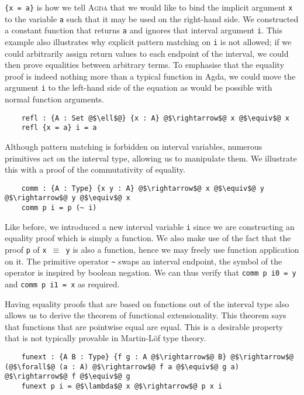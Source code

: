 \documentclass[12pt,twoside,maitrise]{dms}
\theoremstyle{definition}
\numberwithin{equation}{section}
\numberwithin{table}{chapter}
\numberwithin{figure}{chapter}
\newcommand\id[1] {\texttt{#1}}
\newcommand\fn[1] {\texttt{#1}}
\def\Agda{\textsc{Agda}\xspace}
\begin{document}
\fn{\{x = a\}} is how we tell \Agda{} that we would like to bind the implicit
argument \id{x} to the variable \id{a} such that it may be used on the
right-hand side. We constructed a constant function that returns \id{a} and
ignores that interval argument \id{i}. This example also illustrates why
explicit pattern matching on \id{i} is not allowed; if we could arbitrarily
assign return values to each endpoint of the interval, we could then prove
equalities between arbitrary terms. To emphasise that the equality proof is
indeed nothing more than a typical function in Agda, we could move the argument
\id{i} to the left-hand side of the equation as would be possible with normal
function arguments.

\begin{verbatim}
    refl : {A : Set @$\ell$@} {x : A} @$\rightarrow$@ x @$\equiv$@ x
    refl {x = a} i = a
\end{verbatim}

Although pattern matching is forbidden on interval variables, numerous primitives
act on the interval type, allowing us to manipulate them. We illustrate this with
a proof of the commutativity of equality.

\begin{verbatim}
    comm : {A : Type} {x y : A} @$\rightarrow$@ x @$\equiv$@ y @$\rightarrow$@ y @$\equiv$@ x
    comm p i = p (~ i)
\end{verbatim}

Like before, we introduced a new interval variable \id{i} since we are
constructing an equality proof which is simply a function. We also make use of
the fact that the proof \id{p} of \fn{x $\equiv$ y} is also a function, hence we
may freely use function application on it. The primitive operator \id{\~{}}
swaps an interval endpoint, the symbol of the operator is inspired by boolean
negation. We can thus verify that \fn{comm p i0 = y} and \fn{comm p i1 = x} as
required.

Having equality proofs that are based on functions out of the interval type also
allows us to derive the theorem of functional extensionality. This theorem says
that functions that are pointwise equal are equal. This is a desirable property
that is not typically provable in Martin-Löf type
theory\cite{martin1975intuitionistic}.

\begin{verbatim}
    funext : {A B : Type} {f g : A @$\rightarrow$@ B} @$\rightarrow$@ (@$\forall$@ (a : A) @$\rightarrow$@ f a @$\equiv$@ g a) @$\rightarrow$@ f @$\equiv$@ g
    funext p i = @$\lambda$@ x @$\rightarrow$@ p x i
\end{verbatim}
\end{document}
